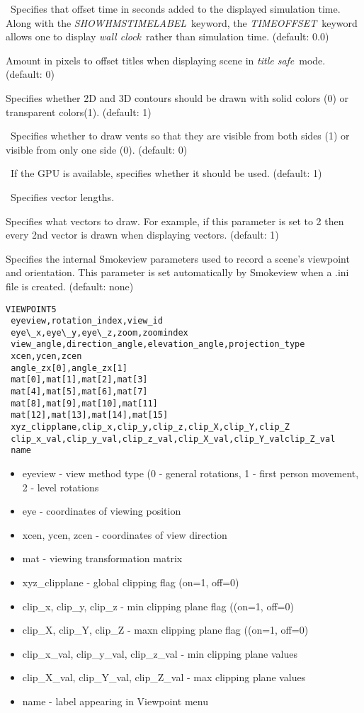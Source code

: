 \documentclass[11pt,twoside]{book}
\newcommand{\hitem}[1]{\item[{\bf #1} \hfill]}
\begin{document}
\hitem{TIMEOFFSET}\ Specifies that offset time in seconds added to
the displayed simulation time.  Along with the {\em
SHOWHMSTIMELABEL}\ keyword, the {\em TIMEOFFSET}\ keyword allows
one to display {\em wall clock}\ rather than simulation time.
(default: 0.0)

\hitem{TITLESAFE}Amount in pixels to offset titles when displaying
scene in {\em title safe}\ mode.   (default: 0)

\hitem{TRANSPARENT}Specifies whether 2D and 3D contours should be
drawn with solid colors (0) or transparent colors(1). (default: 1)

\hitem{TWOSIDEDVENTS}\  Specifies whether to draw vents so that they are visible from
both sides (1) or visible from only one side (0).  (default: 0)

\hitem{USEGPU}\ If the GPU is available, specifies whether it should be used. (default: 1)


\hitem{VECLENGTH}\ Specifies vector lengths.

\hitem{VECTORSKIP}Specifies
what vectors to draw.  For example, if this parameter is set to 2 then
every 2nd vector is drawn when displaying vectors.
(default: 1)

\hitem{VIEWPOINT5}Specifies the internal Smokeview parameters used
to record a scene's viewpoint and orientation.  This parameter is
set automatically by Smokeview when a .ini file is created.
(default: none)

{\small
\begin{lstlisting}
VIEWPOINT5
 eyeview,rotation_index,view_id
 eye\_x,eye\_y,eye\_z,zoom,zoomindex
 view_angle,direction_angle,elevation_angle,projection_type
 xcen,ycen,zcen
 angle_zx[0],angle_zx[1]
 mat[0],mat[1],mat[2],mat[3]
 mat[4],mat[5],mat[6],mat[7]
 mat[8],mat[9],mat[10],mat[11]
 mat[12],mat[13],mat[14],mat[15]
 xyz_clipplane,clip_x,clip_y,clip_z,clip_X,clip_Y,clip_Z
 clip_x_val,clip_y_val,clip_z_val,clip_X_val,clip_Y_valclip_Z_val
 name
\end{lstlisting}
}

\begin{itemize}
\item eyeview - view method type (0 - general rotations,
1 - first person movement, 2 - level rotations
\item eye - coordinates of viewing position
\item xcen, ycen, zcen - coordinates of view direction
\item mat - viewing transformation matrix
\item xyz\_clipplane - global clipping flag (on=1, off=0)
\item clip\_x, clip\_y, clip\_z - min clipping plane flag ((on=1, off=0)
\item clip\_X, clip\_Y, clip\_Z - maxn clipping plane flag ((on=1, off=0)
\item clip\_x\_val, clip\_y\_val, clip\_z\_val - min clipping plane values
\item clip\_X\_val, clip\_Y\_val, clip\_Z\_val - max clipping plane values
\item name - label appearing in Viewpoint menu
\end{itemize}
\end{document}
